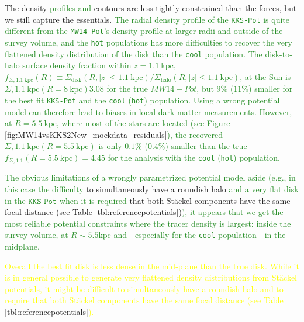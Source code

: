 \documentclass[iop,revtex4,numberedappendix,appendixfloats]{emulateapj}
\newcommand{\NEW}[1]{\textcolor{ForestGreen}{#1}}
\newcommand{\OLD}[1]{\textcolor{Yellow}{#1}}%
\begin{document}
The density \NEW{profiles and} contours are less tightly constrained than the forces, but we still capture the essentials. \NEW{The radial density profile of the \texttt{KKS-Pot} is quite different from the \texttt{MW14-Pot}'s density profile at larger radii and outside of the survey volume, and the \texttt{hot} populations has more difficulties to recover the very flattened density distribution of the disk than the \texttt{cool} population. The disk-to-halo surface density fraction within $z=1.1~\text{kpc}$, $f_{\Sigma,1.1~\text{kpc}}(R) \equiv\Sigma_{\text{disk}}(R,|z|\leq1.1~\text{kpc})/\Sigma_{\text{halo}}(R,|z|\leq1.1~\text{kpc})$, at the Sun is ${\Sigma,1.1~\text{kpc}}(R=8~\text{kpc})3.08$ for the true $MW14-Pot$, but $9\%$ ($11\%$) smaller for the best fit \texttt{KKS-Pot} and the \texttt{cool} (\texttt{hot}) population. Using a wrong potential model can therefore lead to biases in local dark matter measurements. However, at $R=5.5~\text{kpc}$, where most of the stars are located (see Figure \ref{fig:MW14vsKKS2New_mockdata_residuals}), the recovered ${\Sigma,1.1~\text{kpc}}(R=5.5~\text{kpc})$ is only $0.1\%$ ($0.4\%$) smaller than the true $f_{\Sigma,1.1}(R=5.5~\text{kpc})=4.45$ for the analysis with the \texttt{cool} (\texttt{hot}) population. }

\NEW{The obvious limitations of a wrongly parametrized potential model aside (e.g., in this case the difficulty} to simultaneously have a roundish halo \NEW{and a very flat disk in the $\texttt{KKS-Pot}$ when it is required} that both St\"{a}ckel components have the same focal distance (see Table \ref{tbl:referencepotentials})\NEW{), it appears that we get the most reliable potential constraints where the tracer density is largest: inside the survey volume, at $R\sim5.5\text{kpc}$ and---especially for the \texttt{cool} population---in the midplane.}

\OLD{Overall the best fit disk is less dense in the mid-plane than the true disk. While it is in general possible to generate very flattened density distributions from St\"{a}ckel potentials, it might be difficult to simultaneously have a roundish halo and to require that both St\"{a}ckel components have the same focal distance (see Table \ref{tbl:referencepotentials}).}
\end{document}
